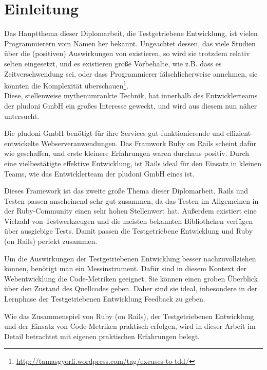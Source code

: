 

\chapter{Einleitung}

Das Hauptthema dieser Diplomarbeit, die Testgetriebene Entwicklung, ist vielen Programmierern vom Namen her bekannt. Ungeachtet dessen, das  viele Studien über die (positiven) Auswirkungen von  existieren, so wird sie trotzdem relativ selten eingesetzt, und es existieren große Vorbehalte, wie z.B. dass es Zeitverschwendung sei, oder dass Programmierer fälschlicherweise annehmen, sie könnten die Komplexität überschauen\footnote{\url{http://tamasgyorfi.wordpress.com/tag/excuses-to-tdd/}}.\\
Diese, stellenweise mythenumrankte Technik, hat innerhalb des Entwicklerteams der pludoni GmbH ein großes Interesse geweckt, und wird aus diesem nun näher untersucht.

Die pludoni GmbH benötigt für ihre Services gut-funktionierende und effizient\hyp{}entwickelte Webserveranwendungen. Das Framwork Ruby on Rails scheint dafür wie geschaffen, und erste kleinere Erfahrungen waren durchaus positiv. Durch eine vielbestätigte effektive Entwicklung, ist Rails ideal für den Einsatz in kleinen Teams, wie das Entwicklerteam der pludoni GmbH eines ist.

Dieses Framework  ist das zweite große Thema dieser Diplomarbeit. Rails und Testen passen anscheinend sehr gut zusammen, da das Testen im Allgemeinen in der Ruby-Community einen sehr hohen Stellenwert hat. Außerdem existiert eine Vielzahl von Testwerkzeugen und die meisten bekannten Bibliotheken verfügen über ausgiebige Tests. Damit passen die Testgetriebene Entwicklung und Ruby (on Rails) perfekt zusammen. 

Um die Auswirkungen der Testgetriebenen Entwicklung besser nachzuvollziehen können, benötigt man ein Messinstrument. Dafür sind in diesem Kontext der Webentwicklung die Code-Metriken geeignet. Sie können einen groben Überblick über den Zustand des Quellcodes geben. Daher sind sie ideal, inbesondere in der Lernphase der Testgetriebenen Entwicklung Feedback zu geben.

Wie das Zusammenspiel von Ruby (on Rails), der Testgetriebenen Entwicklung und der Einsatz von Code-Metriken praktisch erfolgen, wird in dieser Arbeit im Detail betrachtet mit eigenen praktischen Erfahrungen belegt.

